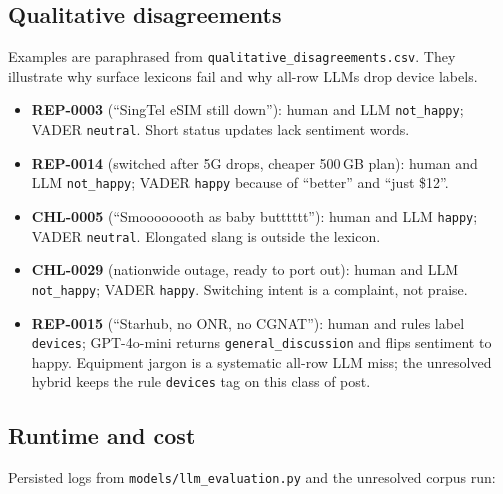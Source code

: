 \documentclass[11pt,a4paper]{article}
\begin{document}
\subsection{Qualitative disagreements}

Examples are paraphrased from \texttt{qualitative\_disagreements.csv}. They illustrate why surface lexicons fail and why all-row LLMs drop device labels.

\begin{itemize}
  \item \textbf{REP-0003} (``SingTel eSIM still down''): human and LLM \texttt{not\_happy}; VADER \texttt{neutral}. Short status updates lack sentiment words.
  \item \textbf{REP-0014} (switched after 5G drops, cheaper 500\,GB plan): human and LLM \texttt{not\_happy}; VADER \texttt{happy} because of ``better'' and ``just \$12''.
  \item \textbf{CHL-0005} (``Smoooooooth as baby butttttt''): human and LLM \texttt{happy}; VADER \texttt{neutral}. Elongated slang is outside the lexicon.
  \item \textbf{CHL-0029} (nationwide outage, ready to port out): human and LLM \texttt{not\_happy}; VADER \texttt{happy}. Switching intent is a complaint, not praise.
  \item \textbf{REP-0015} (``Starhub, no ONR, no CGNAT''): human and rules label \texttt{devices}; GPT-4o-mini returns \texttt{general\_discussion} and flips sentiment to happy. Equipment jargon is a systematic all-row LLM miss; the unresolved hybrid keeps the rule \texttt{devices} tag on this class of post.
\end{itemize}

\subsection{Runtime and cost}

Persisted logs from \texttt{models/llm\_evaluation.py} and the unresolved corpus run:
\end{document}
